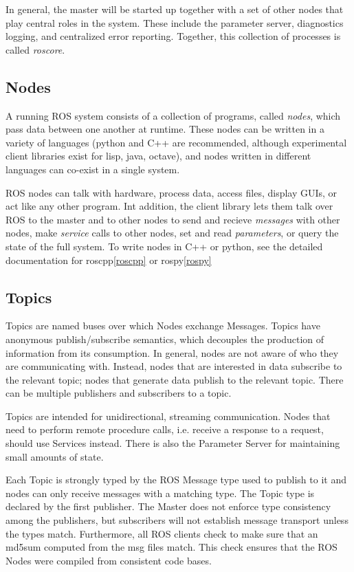 In general, the master will be started up together with a set of other nodes that play central roles in the system.  These include the parameter server, diagnostics logging, and centralized error reporting.  Together, this collection of processes is called {\it roscore}.
\subsection{Nodes}
A running ROS system consists of a collection of programs, called {\it nodes}, which pass data between one another at runtime.
These nodes can be written in a variety of languages (python and C++ are recommended, although experimental client libraries exist for lisp, java, octave), and nodes written in different languages can co-exist in a single system.

ROS nodes can talk with hardware, process data, access files, display GUIs, or act like any other program. Int addition, the client library lets them talk over ROS to the master and to other nodes to send and recieve {\it messages} with other nodes, make {\it service} calls to other nodes, set and read {\it parameters}, or query the state of the full system.  To write nodes in C++ or python, see the detailed documentation for roscpp\ref{roscpp} or rospy\ref{rospy}

\subsection{Topics}
Topics are named buses over which Nodes exchange Messages. Topics have anonymous publish/subscribe semantics, which decouples the production of information from its consumption. In general, nodes are not aware of who they are communicating with. Instead, nodes that are interested in data subscribe to the relevant topic; nodes that generate data publish to the relevant topic. There can be multiple publishers and subscribers to a topic.

Topics are intended for unidirectional, streaming communication. Nodes that need to perform remote procedure calls, i.e. receive a response to a request, should use Services instead. There is also the Parameter Server for maintaining small amounts of state. 

Each Topic is strongly typed by the ROS Message type used to publish to it and nodes can only receive messages with a matching type. The Topic type is declared by the first publisher. The Master does not enforce type consistency among the publishers, but subscribers will not establish message transport unless the types match. Furthermore, all ROS clients check to make sure that an md5sum computed from the msg files match. This check ensures that the ROS Nodes were compiled from consistent code bases. 
